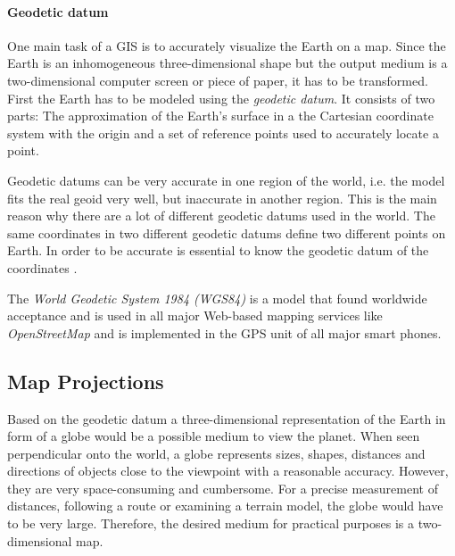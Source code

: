

\paragraph{Geodetic datum} %
\label{par:geodetic_datum}


One main task of a GIS is to accurately visualize the Earth on a map. Since the Earth is an inhomogeneous three-dimensional shape but the output medium is a two-dimensional computer screen or piece of paper, it has to be transformed. First the Earth has to be modeled using the \emph{geodetic datum}. It consists of two parts: The approximation of the Earth's surface in a the Cartesian coordinate system with the origin and a set of reference points used to accurately locate a point.

Geodetic datums can be very accurate in one region of the world, i.e. the model fits the real geoid very well, but inaccurate in another region. This is the main reason why there are a lot of different geodetic datums used in the world. The same coordinates in two different geodetic datums define two different points on Earth. In order to be accurate is essential to know the geodetic datum of the coordinates
\cite[p. 80]{bolstad2008gis}.

The \emph{World Geodetic System 1984 (WGS84)} is a model that found worldwide acceptance and is used in all major Web-based mapping services like \emph{OpenStreetMap} and is implemented in the GPS unit of all major smart phones.




\subsection{Map Projections} %
\label{sub:map_projections}

Based on the geodetic datum a three-dimensional representation of the Earth in form of a globe would be a possible medium to view the planet. When seen perpendicular onto the world, a globe represents sizes, shapes, distances and directions of objects close to the viewpoint with a reasonable accuracy. However, they are very space-consuming and cumbersome. For a precise measurement of distances, following a route or examining a terrain model, the globe would have to be very large. Therefore, the desired medium for practical purposes is a two-dimensional map.

